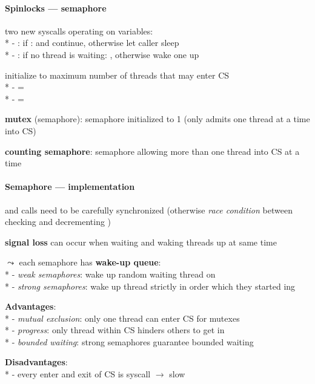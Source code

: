 \paragraph{Spinlocks --- semaphore}
\begin{items}
  \item two new syscalls operating on  variables: \\*
    - : if :  and continue, otherwise let caller sleep \\*
    - : if no thread is waiting: , otherwise wake one up
  \item initialize  to maximum number of threads that may enter CS \\*
    -  =  \\*
    -  = 
  \item \textbf{mutex} (semaphore): semaphore initialized to 1 (only admits one thread at a time into CS)
  \item \textbf{counting semaphore}: semaphore allowing more than one thread into CS at a time
\end{items}

\paragraph{Semaphore --- implementation}
\begin{items}
  \item {} and  calls need to be carefully synchronized (otherwise \emph{race condition} between checking and decrementing )
  \item \textbf{signal loss} can occur when waiting and waking threads up at same time
  \item \( \leadsto \) each semaphore has \textbf{wake-up queue}: \\*
    - \emph{weak semaphores}: wake up random waiting thread on  \\*
    - \emph{strong semaphores}: wake up thread strictly in order which they started ing
  \item \textbf{Advantages}: \\*
    - \emph{mutual exclusion}: only one thread can enter CS for mutexes \\*
    - \emph{progress}: only thread within CS hinders others to get in \\*
    - \emph{bounded waiting}: strong semaphores guarantee bounded waiting
  \item \textbf{Disadvantages}: \\*
    - every enter and exit of CS is syscall \( \to \) slow
\end{items}

